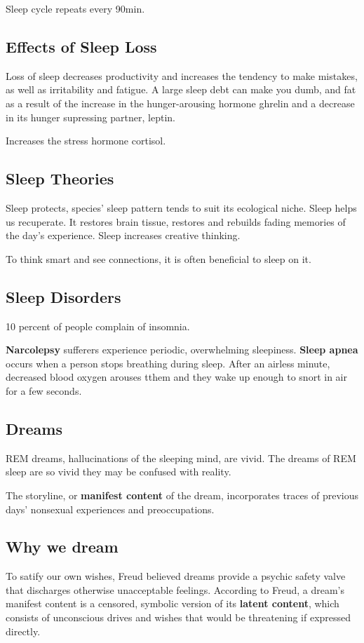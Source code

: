 \documentclass[12pt]{article}
\begin{document}
Sleep cycle repeats every 90min. 

\subsection{Effects of Sleep Loss}
Loss of sleep decreases productivity and increases the tendency to make mistakes, as well as irritability and fatigue. A large sleep debt can make you dumb, and fat as a result of the increase in the hunger-arousing hormone ghrelin and a decrease in its hunger supressing partner, leptin. 

Increases the stress hormone cortisol. 

\subsection*{Sleep Theories}
Sleep protects, species' sleep pattern tends to suit its ecological niche. Sleep helps us recuperate. It restores brain tissue, restores and rebuilds fading memories of the day's experience. Sleep increases creative thinking. 

To think smart and see connections, it is often beneficial to sleep on it. 

\subsection*{Sleep Disorders}
10 percent of people complain of insomnia. 

\textbf{Narcolepsy} sufferers experience periodic, overwhelming sleepiness. \textbf{Sleep apnea} occurs when a person stops breathing during sleep. After an airless minute, decreased blood oxygen arouses tthem and they wake up enough to snort in air for a few seconds.

\subsection*{Dreams}
REM dreams, hallucinations of the sleeping mind, are vivid. The dreams of REM sleep are so vivid they may be confused with reality.

The storyline, or \textbf{manifest content} of the dream, incorporates traces of previous days' nonsexual experiences and preoccupations.

\subsection*{Why we dream}
To satify our own wishes, Freud believed dreams provide a psychic safety valve that discharges otherwise unacceptable feelings. According to Freud, a dream's manifest content is a censored, symbolic version of its \textbf{latent content}, which consists of unconscious drives and wishes that would be threatening if expressed directly.
\end{document}

